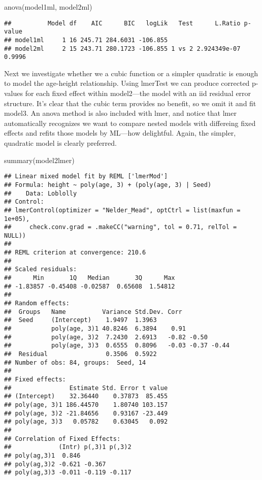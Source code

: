 \documentclass[
]{book}
\newenvironment{Shaded}{\begin{snugshade}}{\end{snugshade}}
\newcommand{\FunctionTok}[1]{\textcolor[rgb]{0.00,0.00,0.00}{#1}}
\newcommand{\NormalTok}[1]{#1}
\begin{document}
\begin{Shaded}
\begin{Highlighting}[]
\FunctionTok{anova}\NormalTok{(model1ml, model2ml)}
\end{Highlighting}
\end{Shaded}

\begin{verbatim}
##          Model df    AIC      BIC   logLik   Test      L.Ratio p-value
## model1ml     1 16 245.71 284.6031 -106.855                            
## model2ml     2 15 243.71 280.1723 -106.855 1 vs 2 2.924349e-07  0.9996
\end{verbatim}

Next we investigate whether we a cubic function or a simpler quadratic is enough to model the age-height relationship. Using lmerTest we can produce corrected p-values for each fixed effect within model2---the model with an iid residual error structure. It's clear that the cubic term provides no benefit, so we omit it and fit model3. An anova method is also included with lmer, and notice that lmer automatically recognizes we want to compare nested models with differeing fixed effects and refits those models by ML---how delightful. Again, the simpler, quadratic model is clearly preferred.

\begin{Shaded}
\begin{Highlighting}[]
\FunctionTok{summary}\NormalTok{(model2lmer)}
\end{Highlighting}
\end{Shaded}

\begin{verbatim}
## Linear mixed model fit by REML ['lmerMod']
## Formula: height ~ poly(age, 3) + (poly(age, 3) | Seed)
##    Data: Loblolly
## Control: 
## lmerControl(optimizer = "Nelder_Mead", optCtrl = list(maxfun = 1e+05),  
##     check.conv.grad = .makeCC("warning", tol = 0.71, relTol = NULL))
## 
## REML criterion at convergence: 210.6
## 
## Scaled residuals: 
##      Min       1Q   Median       3Q      Max 
## -1.83857 -0.45408 -0.02587  0.65608  1.54812 
## 
## Random effects:
##  Groups   Name          Variance Std.Dev. Corr             
##  Seed     (Intercept)    1.9497  1.3963                    
##           poly(age, 3)1 40.8246  6.3894    0.91            
##           poly(age, 3)2  7.2430  2.6913   -0.82 -0.50      
##           poly(age, 3)3  0.6555  0.8096   -0.03 -0.37 -0.44
##  Residual                0.3506  0.5922                    
## Number of obs: 84, groups:  Seed, 14
## 
## Fixed effects:
##                Estimate Std. Error t value
## (Intercept)    32.36440    0.37873  85.455
## poly(age, 3)1 186.44570    1.80740 103.157
## poly(age, 3)2 -21.84656    0.93167 -23.449
## poly(age, 3)3   0.05782    0.63045   0.092
## 
## Correlation of Fixed Effects:
##             (Intr) p(,3)1 p(,3)2
## poly(ag,3)1  0.846              
## poly(ag,3)2 -0.621 -0.367       
## poly(ag,3)3 -0.011 -0.119 -0.117
\end{verbatim}
\end{document}
